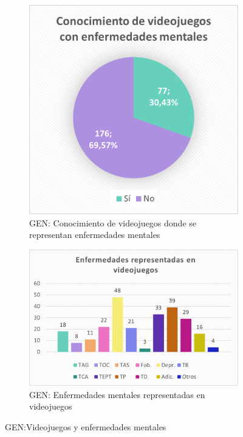 \documentclass[12pt, a4paper,twoside,titlepage]{book}
\begin{document}
\begin{figure}
\centering
\begin{subfigure}{.4\textwidth}
  \centering
  \includegraphics[width=.95\linewidth]{Imagenes Form GEN/7GENConenf}
  \caption{GEN: Conocimiento de videojuegos donde se representan enfermedades mentales}
\end{subfigure}%
\begin{subfigure}{.6\textwidth}
  \centering
  \includegraphics[width=.95\linewidth]{Imagenes Form GEN/8GENConenf}
  \caption{GEN: Enfermedades mentales representadas en videojuegos}
\end{subfigure}
\caption{GEN:Videojuegos y enfermedades mentales}
\label{fig:GENConvid}
\end{figure}
\end{document}
